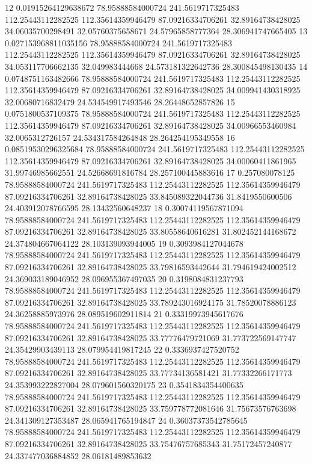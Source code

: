 {12 0.01915264129638672 78.95888584000724 241.5619717325483 112.25443112282525 112.35614359946479 87.09216334706261 32.89164738428025 34.06035700298491 32.05760375658671 24.57965858777364 28.306941747665405
13 0.027153968811035156 78.95888584000724 241.5619717325483 112.25443112282525 112.35614359946479 87.09216334706261 32.89164738428025 34.053117706662135 32.049983444668 24.573181322642736 28.300845498130435
14 0.0748751163482666 78.95888584000724 241.5619717325483 112.25443112282525 112.35614359946479 87.09216334706261 32.89164738428025 34.009941430318925 32.00680716832479 24.534549917493546 28.26448652857826
15 0.0751800537109375 78.95888584000724 241.5619717325483 112.25443112282525 112.35614359946479 87.09216334706261 32.89164738428025 34.00966553460984 32.0065312726157 24.534317584264848 28.264254195349558
16 0.08519530296325684 78.95888584000724 241.5619717325483 112.25443112282525 112.35614359946479 87.09216334706261 32.89164738428025 34.00060411861965 31.99746985662551 24.52668691816784 28.257100445883616
17 0.257080078125 78.95888584000724 241.5619717325483 112.25443112282525 112.35614359946479 87.09216334706261 32.89164738428025 33.845089322044736 31.8419550600506 24.403912078766595 28.13432560648237
18 0.30074119567871094 78.95888584000724 241.5619717325483 112.25443112282525 112.35614359946479 87.09216334706261 32.89164738428025 33.80558640616281 31.802452144168672 24.374804667064122 28.103139093944005
19 0.3093984127044678 78.95888584000724 241.5619717325483 112.25443112282525 112.35614359946479 87.09216334706261 32.89164738428025 33.79816593442644 31.794619424002512 24.369033189046952 28.096955367497035
20 0.3198084831237793 78.95888584000724 241.5619717325483 112.25443112282525 112.35614359946479 87.09216334706261 32.89164738428025 33.789243016924175 31.78520078886123 24.36258885973976 28.089519602911814
21 0.33319973945617676 78.95888584000724 241.5619717325483 112.25443112282525 112.35614359946479 87.09216334706261 32.89164738428025 33.77776479721069 31.773722569147747 24.35429903439113 28.079954419817245
22 0.3336937427520752 78.95888584000724 241.5619717325483 112.25443112282525 112.35614359946479 87.09216334706261 32.89164738428025 33.77734136581421 31.77332266171773 24.353993222827004 28.079601560320175
23 0.3541834354400635 78.95888584000724 241.5619717325483 112.25443112282525 112.35614359946479 87.09216334706261 32.89164738428025 33.759778772081646 31.75673576763698 24.341309127353487 28.065941765194847
24 0.36037373542785645 78.95888584000724 241.5619717325483 112.25443112282525 112.35614359946479 87.09216334706261 32.89164738428025 33.75476757685343 31.75172457240877 24.337477036884852 28.06181489853632
}
